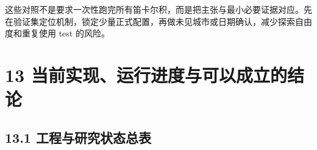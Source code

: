 \documentclass[UTF8,10pt,a4paper,fontset=fandol]{ctexart}
\begin{document}
这些对照不是要求一次性跑完所有笛卡尔积，而是把主张与最小必要证据对应。先在验证集定位机制，锁定少量正式配置，再做未见城市或日期确认，减少探索自由度和重复使用 test 的风险。


\section*{13 当前实现、运行进度与可以成立的结论}


\subsection*{13.1 工程与研究状态总表}

\end{document}
